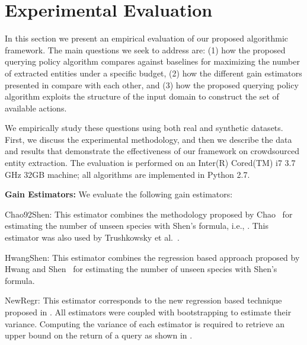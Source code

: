 

\section{Experimental Evaluation}
\label{sec:exps}
In this section we present an empirical evaluation of our proposed algorithmic framework. The main questions we seek to address are: (1) how the proposed querying policy algorithm compares against baselines for maximizing the number of extracted entities under a specific budget, (2) how the different gain estimators presented in  compare with each other, and (3) how the proposed querying policy algorithm exploits the structure of the input domain to construct the set of available actions.

We empirically study these questions using both real and synthetic datasets. First, we discuss the experimental methodology, and then we describe the data and results that demonstrate the effectiveness of our framework on crowdsourced entity extraction. The evaluation is performed on an Inter(R) Cored(TM) i7 3.7 GHz 32GB machine; all algorithms are implemented in Python 2.7. 

\vspace{5pt}\noindent\textbf{Gain Estimators:} We evaluate the following gain estimators:
\squishlist
\item Chao92Shen: This estimator combines the methodology proposed by Chao~\cite{chao:1992} for estimating the number of unseen species  with Shen's formula, i.e., . This estimator was also used by Trushkowsky et al.~\cite{trushkowsky:2013}.
\item HwangShen: This estimator combines the regression based approach proposed by Hwang and Shen~\cite{hwang:2010} for estimating the number of unseen species with Shen's formula. 
\item NewRegr: This estimator corresponds to the new regression based technique proposed in .
\squishend
All estimators were coupled with bootstrapping to estimate their variance. Computing the variance of each estimator is required to retrieve an upper bound on the return of a query as shown in .

